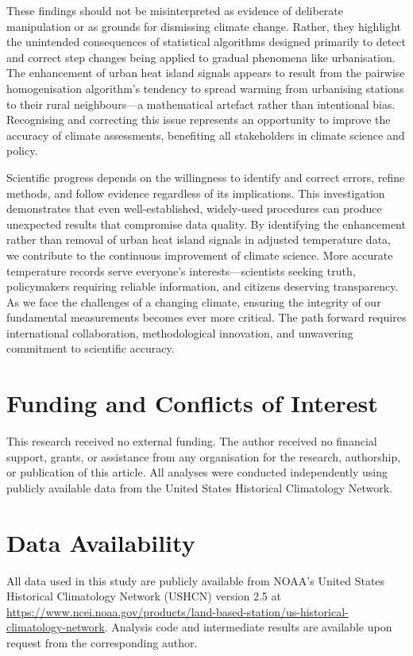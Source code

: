 \documentclass[11pt, a4paper]{article}
\begin{document}
These findings should not be misinterpreted as evidence of deliberate manipulation or as grounds for dismissing climate change. Rather, they highlight the unintended consequences of statistical algorithms designed primarily to detect and correct step changes being applied to gradual phenomena like urbanisation. The enhancement of urban heat island signals appears to result from the pairwise homogenisation algorithm's tendency to spread warming from urbanising stations to their rural neighbours—a mathematical artefact rather than intentional bias. Recognising and correcting this issue represents an opportunity to improve the accuracy of climate assessments, benefiting all stakeholders in climate science and policy.

Scientific progress depends on the willingness to identify and correct errors, refine methods, and follow evidence regardless of its implications. This investigation demonstrates that even well-established, widely-used procedures can produce unexpected results that compromise data quality. By identifying the enhancement rather than removal of urban heat island signals in adjusted temperature data, we contribute to the continuous improvement of climate science. More accurate temperature records serve everyone's interests—scientists seeking truth, policymakers requiring reliable information, and citizens deserving transparency. As we face the challenges of a changing climate, ensuring the integrity of our fundamental measurements becomes ever more critical. The path forward requires international collaboration, methodological innovation, and unwavering commitment to scientific accuracy.


\section*{Funding and Conflicts of Interest}

This research received no external funding. The author received no financial support, grants, or assistance from any organisation for the research, authorship, or publication of this article. All analyses were conducted independently using publicly available data from the United States Historical Climatology Network.

\section*{Data Availability}

All data used in this study are publicly available from NOAA's United States Historical Climatology Network (USHCN) version 2.5 at \url{https://www.ncei.noaa.gov/products/land-based-station/us-historical-climatology-network}. Analysis code and intermediate results are available upon request from the corresponding author.

\printbibliography[title={References}] %
\end{document}
